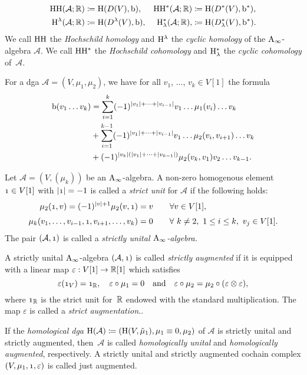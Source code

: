 \documentclass[\MainFolder/Text.tex]{subfiles}
\begin{document}
\begin{Definition}
$$ \begin{aligned}
\mathrm{H}\mathrm{H}(\mathcal{A};\mathbb{R})& \coloneqq \mathrm{H}(D(V), \mathrm{b}), & \mathrm{H}\mathrm{H}^*(\mathcal{A};\mathbb{R}) &\coloneqq \mathrm{H}(D^*(V),\mathrm{b}^*),\\  
\mathrm{H}^\lambda(\mathcal{A};\mathbb{R})& \coloneqq \mathrm{H}(D^\lambda(V), \mathrm{b}), & \mathrm{H}^*_\lambda(\mathcal{A};\mathbb{R}), &\coloneqq \mathrm{H}(D^*_\lambda(V),\mathrm{b}^*).
\end{aligned} $$
We call $\mathrm{H}\mathrm{H}$ the \emph{Hochschild homology} and $\mathrm{H}^\lambda$ the \emph{cyclic homology} of the $\mathrm{A}_\infty$-algebra $\mathcal{A}$. We call $\mathrm{H}\mathrm{H}^*$ the \emph{Hochschild cohomology} and $\mathrm{H}_\lambda^*$ the \emph{cyclic cohomology} of~$\mathcal{A}$.
\end{Definition}

For a dga $\mathcal{A} = (V,\mu_1,\mu_2)$, we have for all $v_1$, $\dotsc$, $v_k\in V[1]$ the formula
\begin{align*}
 \mathrm{b}(v_1 \dots v_k) &= \sum_{i=1}^k (-1)^{|v_1| + \dotsb + |v_{i-1}|} v_1 \dots \mu_1(v_i) \dots v_k  \\ 
   &+ \sum_{i=1}^{k-1} (-1)^{|v_1| + \dotsb + |v_{i-1}|} v_1 \dots \mu_2(v_i,v_{i+1}) \dots v_k \\
   &+ (-1)^{|v_k|(|v_1| + \dotsb + |v_{k-1}|)} \mu_2(v_k,v_1)v_2\dots v_{k-1}.
\end{align*}


\begin{Definition}\label{Def:AugUnit}
Let $\mathcal{A}= (V, (\mu_k))$ be an $\mathrm{A}_\infty$-algebra. A non-zero homogenous element $\NOne \in V[1]$ with $\Abs{\NOne} = -1$ is called a \emph{strict unit} for $\mathcal{A}$ if the following holds:
$$\begin{aligned} \mu_2(\NOne, v) = (-1)^{\Abs{v} + 1}\mu_2(v,\NOne) &= v\qquad\forall v\in V[1], \\[\jot]
\mu_k(v_1, \dotsc, v_{i-1}, \NOne, v_{i+1}, \dotsc, v_k) &= 0\qquad\forall\ k\neq 2,\ 1\le i \le k,\ v_j \in V[1]. \end{aligned}$$
The pair $(\mathcal{A},\NOne)$ is called a \emph{strictly unital  $\mathrm{A}_\infty$-algebra.}

A strictly unital $\mathrm{A}_\infty$-algebra $(\mathcal{A},\NOne)$ is called \emph{strictly augmented} if it is equipped with a linear map $\varepsilon: V[1] \rightarrow \mathbb{R}[1]$ which satisfies
$$ \varepsilon(\NOne_V) = \NOne_\R, \quad \varepsilon \circ \mu_1 = 0\quad\text{and}\quad \varepsilon \circ \mu_2 = \mu_2\circ(\varepsilon \otimes \varepsilon), $$
where $\NOne_\R$ is the strict unit for~$\mathbb{R}$ endowed with the standard multiplication. The map $\varepsilon$ is called a \emph{strict augmentation.}.

If the \emph{homological dga} $\mathrm{H}(\mathcal{A})\coloneqq (\mathrm{H}(V,\tilde{\mu}_1), \mu_1 \equiv 0, \mu_2)$ of $\mathcal{A}$ is strictly unital and strictly augmented, then~$\mathcal{A}$ is called \emph{homologically unital} and \emph{homologically augmented}, respectively. A strictly unital and strictly augmented cochain complex $(V,\mu_1,\NOne,\varepsilon)$ is called just augmented. 
\end{Definition}
\end{document}
